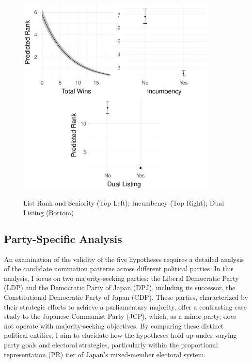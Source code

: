 \documentclass[a4paper, 11pt]{article}
\begin{document}
\begin{figure}[!thb]
	\caption{List Rank and Seniority (Top Left); Incumbency (Top Right); Dual Listing (Bottom)}
	\includegraphics[width = 0.9\textwidth]{../figure/paper/h1_h2_h3.pdf}
	\label{fig:rank}
\end{figure}

\subsection{Party-Specific Analysis}

An examination of the validity of the five hypotheses requires a detailed analysis of the candidate nomination patterns across different political parties. In this analysis, I focus on two majority-seeking parties: the Liberal Democratic Party (LDP) and the Democratic Party of Japan (DPJ), including its successor, the Constitutional Democratic Party of Japan (CDP). These parties, characterized by their strategic efforts to achieve a parliamentary majority, offer a contrasting case study to the Japanese Communist Party (JCP), which, as a minor party, does not operate with majority-seeking objectives. \footnotemark{} By comparing these distinct political entities, I aim to elucidate how the hypotheses hold up under varying party goals and electoral strategies, particularly within the proportional representation (PR) tier of Japan's mixed-member electoral system.

\end{document}
